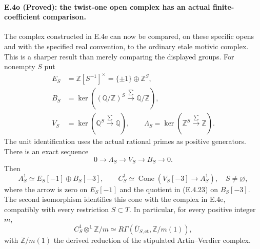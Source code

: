 \paragraph{E.4o (Proved): the twist-one open complex has an actual finite-coefficient comparison.}
The complex constructed in E.4e can now be compared, on these
specific opens and with the specified real convention, to the
ordinary etale motivic complex. This is a sharper result than
merely comparing the displayed groups. For nonempty $S$ put
\[
 \begin{split}
 E_S&=\mathbb Z[S^{-1}]^\times=\{\pm1\}\oplus\mathbb Z^S,\\
 B_S&=\ker\left((\mathbb Q/\mathbb Z)^S
                     \xrightarrow{\sum}\mathbb Q/\mathbb Z\right),\\
 V_S&=\ker\left(\mathbb Q^S\xrightarrow{\sum}\mathbb Q\right),
 \qquad
 \Lambda_S=\ker\left(\mathbb Z^S\xrightarrow{\sum}\mathbb Z\right).
 \end{split}
 \tag{E.4.22}
\]
The unit identification uses the actual rational primes as
positive generators. There is an exact sequence
\[
 0\longrightarrow\Lambda_S\longrightarrow V_S
       \longrightarrow B_S\longrightarrow0.
 \tag{E.4.23}
\]
Then
\[
 A_S^1\simeq E_S[-1]\oplus B_S[-3],
 \qquad
 C_S^1\simeq
 \operatorname{Cone}\left(V_S[-3]\longrightarrow A_S^1\right),
 \quad S\ne\varnothing,
 \tag{E.4.24}
\]
where the arrow is zero on $E_S[-1]$ and the quotient in
(E.4.23) on $B_S[-3]$. The second isomorphism identifies this
cone with the complex in E.4e, compatibly with every restriction
$S\subset T$. In particular, for every positive integer $m$,
\[
 C_S^1\otimes^{\mathbb L}\mathbb Z/m
   \simeq
 R\Gamma(\overline U_{S,\mathrm{et}},\mathbb Z/m(1)),
 \tag{E.4.25}
\]
with $\mathbb Z/m(1)$ the derived reduction of the stipulated
Artin--Verdier complex.

